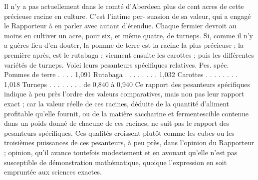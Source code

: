 Il n'y a pas actuellement dans le comté d'Aberdeen plus de cent acres de cette précieuse racine en culture. C'est l'intime per-\setcounter{page}{385} suasion de sa valeur, qui a engagé le Rapporteur à en parler avec autant d'étendue. Chaque fermier devroit au moins en cultiver un acre, pour six, et même quatre, de turneps. Si, comme il n'y a guères lieu d'en douter, la pomme de terre est la racine la plus précieuse ; la première après, est le rutabaga ; viennent ensuite les carottes ; puis les différentes variétés de turneps. Voici leurs pesanteurs spécifiques relatives.
Pes. spéc.
Pommes de terre . . . . 1,091
Rutabaga . . . . . . . . 1,032
Carottes . . . . . . . . 1,018
Turneps . . . . . . . . de 0,840 à 0,940
Ce rapport des pesanteurs spécifiques indique à peu près l'ordre des valeurs comparatives, mais non pas leur rapport exact ; car la valeur réelle de ces racines, déduite de la quantité d'aliment profitable qu'elle fournit, ou de la matière saccharine et fermentescible contenue dans un poids donné de chacune de ces racines, ne suit pas le rapport des pesanteurs spécifiques. Ces qualités croissent plutôt comme les cubes ou les troisièmes puissances de ces pesanteurs, à peu près, dans l'opinion du Rapporteur ; opinion, qu'il avance toutefois modestement et en avouant qu'elle n'est pas susceptible\setcounter{page}{386} de démonstration mathématique, quoique l'expression en soit empruntée aux sciences exactes.
